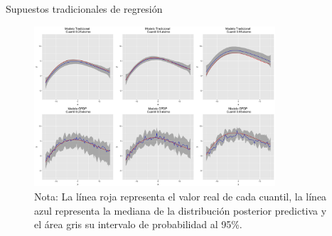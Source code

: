 \documentclass{beamer}
\begin{document}
\begin{frame}{Supuestos tradicionales de regresi\'on}
    \begin{figure}[H]
        \centering
        \includegraphics[width=0.8\textwidth]{Figures/Simulation/classic/presentation.png}
        \captionsetup{singlelinecheck=off,font=footnotesize}
        \caption*{Nota: La l\'inea roja representa el valor real de cada cuantil, la l\'inea azul representa la mediana de la distribuci\'on posterior predictiva y el \'area gris su intervalo de probabilidad al 95\%.}
    \end{figure}
\end{frame}
\end{document}
